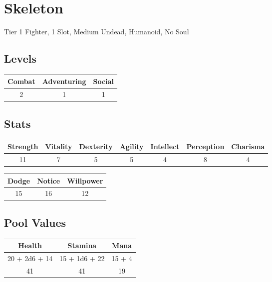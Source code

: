 \section{Skeleton}
Tier 1 Fighter, 1 Slot, Medium Undead, Humanoid, No Soul\\

\subsection{Levels}
\begin{minipage}[H]{1\textwidth}
    \centering
    \begin{tabular}[c]{|c | c | c|}
        \hline
        Combat & Adventuring & Social\\
        \hline
        2 & 1 & 1\\
        \hline
    \end{tabular}
\end{minipage}

\subsection{Stats}
\begin{minipage}[H]{1\textwidth}
    \centering
    \begin{tabular}[c]{|c | c | c | c | c | c | c|}
        \hline
        Strength & Vitality & Dexterity & Agility & Intellect & Perception & Charisma\\
        \hline
        11 & 7 & 5 & 5 & 4 & 8 & 4\\
        \hline
    \end{tabular}
\end{minipage}

\begin{minipage}[H]{1\textwidth}
    \centering
    \begin{tabular}[c]{|c | c | c|}
        \hline
        Dodge & Notice & Willpower\\
        \hline
        15 & 16 & 12\\
        \hline
    \end{tabular}
\end{minipage}

\subsection{Pool Values}
\begin{minipage}[H]{1\textwidth}
    \centering
    \begin{tabular}[c]{|c | c | c|}
        \hline
        Health & Stamina & Mana\\
        \hline
        20 + 2d6 + 14 & 15 + 1d6 + 22 & 15 + 4\\
        41 & 41 & 19\\
        \hline
    \end{tabular}
\end{minipage}


